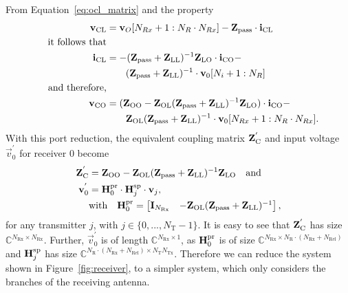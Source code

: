 From Equation~\eqref{eq:ocl_matrix} and the property
\begin{align}
\mathbf{v}_\text{CL} &= \mathbf{v}_O[N_{Rx}+1:N_R\cdot N_{Rx}]-\mathbf{Z}_{\text{pass}}\cdot\mathbf{i}_\text{CL}
\\\nonumber\quad\text{it follows that}&\\
\mathbf{i}_\text{CL} &= -(\mathbf{Z}_{\text{pass}} + \mathbf{Z}_\text{LL})^{-1}\mathbf{Z}_\text{LO}\cdot\mathbf{i}_\text{CO} -\\\nonumber
&\qquad (\mathbf{Z}_{\text{pass}} + \mathbf{Z}_\text{LL})^{-1}\cdot\mathbf{v}_{0}[N_i+1:N_R]\\\nonumber\quad\text{and therefore,}&\\
\mathbf{v}_\text{CO} &= (\mathbf{Z}_\text{OO}-\mathbf{Z}_\text{OL}(\mathbf{Z}_{\text{pass}} + \mathbf{Z}_\text{LL})^{-1}\mathbf{Z}_\text{LO})\cdot\mathbf{i}_\text{CO} -\\\nonumber&\qquad \mathbf{Z}_\text{OL}(\mathbf{Z}_{\text{pass}} + \mathbf{Z}_\text{LL})^{-1}\cdot\mathbf{v}_0[N_{Rx}+1:N_R\cdot N_{Rx}].
\end{align}
With this port reduction, the equivalent coupling matrix $\mathbf{Z}_\text{C}^{'}$ and input voltage $\vec{v}_0^{'}$ for receiver 0 become
\begin{align}
\label{eq:port_reduction}
\mathbf{Z}_\text{C}^{'}&= \mathbf{Z}_\text{OO} - \mathbf{Z}_\text{OL}(\mathbf{Z}_{\text{pass}} + \mathbf{Z}_\text{LL})^{-1}\mathbf{Z}_\text{LO}\quad\text{and}\\
\mathbf{v}_0^{'} &= \mathbf{H}_0^{\text{pr}} \cdot\mathbf{H}_{j}^{\text{sp}}\cdot \mathbf{v}_j,\\\nonumber
&\text{with}\quad\mathbf{H}_0^{\text{pr}}=
\begin{bmatrix}
\mathbf{I}_{N_\text{Rx}} & -\mathbf{Z}_\text{OL}(\mathbf{Z}_{\text{pass}} + \mathbf{Z}_\text{LL})^{-1}
\end{bmatrix},
\end{align}
for any transmitter $j$, with $j\in\{0,...,N_\text{T}-1\}$.
It is easy to see that $\mathbf{Z}_\text{C}^{'}$ has size $\mathbb{C}^{N_\text{Rx}\times N_\text{Rx}}$.
Further, $\vec{v}_0^{'}$ is of length $\mathbb{C}^{N_\text{Rx}\times 1}$, as 
$\mathbf{H}_0^{\text{pr}}$ is of size 
	$\mathbb{C}^{N_\text{Rx}\times N_\text{R}\cdot\left(N_\text{Rx}+N_\text{Rel}\right)}$ 
and $\mathbf{H}_j^{\text{sp}}$ has size 
	$\mathbb{C}^{N_\text{R}\cdot\left(N_\text{Rx}+N_\text{Rel}\right)\times N_\text{T}N_\text{Tx}}$.
Therefore we can reduce the system shown in Figure~\ref{fig:receiver}, to a simpler system, which only considers the branches of the receiving antenna.





